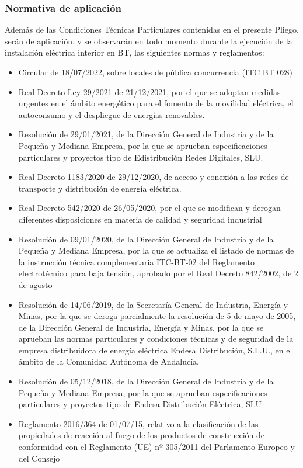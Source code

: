 \documentclass[../main.tex]{subfiles}
\begin{document}
\subsubsection{Normativa de aplicación}
Además de las Condiciones Técnicas Particulares contenidas en el presente Pliego, serán de aplicación, y se observarán en todo momento durante la ejecución de la instalación eléctrica interior en BT, las siguientes normas y reglamentos:
\begin{itemize}
    \item Circular de 18/07/2022, sobre locales de pública concurrencia (ITC BT 028)
    \item Real Decreto Ley 29/2021 de 21/12/2021, por el que se adoptan medidas urgentes en el ámbito energético para el fomento de la movilidad eléctrica, el autoconsumo y el despliegue de energías renovables.
    \item Resolución de 29/01/2021, de la Dirección General de Industria y de la Pequeña y Mediana Empresa, por la que se aprueban especificaciones particulares y proyectos tipo de Edistribución Redes Digitales, SLU.
    \item Real Decreto 1183/2020 de 29/12/2020, de acceso y conexión a las redes de transporte y distribución de energía eléctrica.
    \item Real Decreto 542/2020 de 26/05/2020, por el que se modifican y derogan diferentes disposiciones en materia de calidad y seguridad industrial
    \item Resolución de 09/01/2020, de la Dirección General de Industria y de la Pequeña y Mediana Empresa, por la que se actualiza el listado de normas de la instrucción técnica complementaria ITC-BT-02 del Reglamento electrotécnico para baja tensión, aprobado por el Real Decreto 842/2002, de 2 de agosto
    \item Resolución de 14/06/2019, de la Secretaría General de Industria, Energía y Minas, por la que se deroga parcialmente la resolución de 5 de mayo de 2005, de la Dirección General de Industria, Energía y Minas, por la que se aprueban las normas particulares y condiciones técnicas y de seguridad de la empresa distribuidora de energía eléctrica Endesa Distribución, S.L.U., en el ámbito de la Comunidad Autónoma de Andalucía.
    \item Resolución de 05/12/2018, de la Dirección General de Industria y de la Pequeña y Mediana Empresa, por la que se aprueban especificaciones particulares y proyectos tipo de Endesa Distribución Eléctrica, SLU
    \item Reglamento 2016/364 de 01/07/15, relativo a la clasificación de las propiedades de reacción al fuego de los productos de construcción de conformidad con el Reglamento (UE) nº 305/2011 del Parlamento Europeo y del Consejo

\end{itemize}
\end{document}
